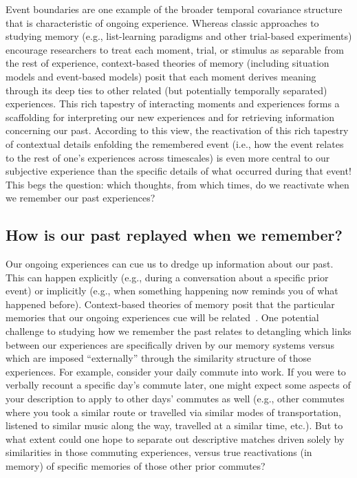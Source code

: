 \documentclass{article}
\begin{document}
Event boundaries are one example of the broader temporal covariance structure that is characteristic of ongoing experience.  Whereas classic approaches to studying memory (e.g., list-learning paradigms and other trial-based experiments) encourage researchers to treat each moment, trial, or stimulus as separable from the rest of experience, context-based theories of memory (including situation models and event-based models) posit that each moment derives meaning through its deep ties to other related (but potentially temporally separated) experiences.  This rich tapestry of interacting moments and experiences forms a scaffolding for interpreting our new experiences and for retrieving information concerning our past.  According to this view, the reactivation of this rich tapestry of contextual details enfolding the remembered event (i.e., how the event relates to the rest of one's experiences across timescales) is even more central to our subjective experience than the specific details of what occurred during that event!  This begs the question: which thoughts, from which times, do we reactivate when we remember our past experiences?

\subsection*{How is our past replayed when we remember?}
Our ongoing experiences can cue us to dredge up information about our past.  This can happen explicitly (e.g., during a conversation about a specific prior event) or implicitly (e.g., when something happening now reminds you of what happened before).  Context-based theories of memory posit that the particular memories that our ongoing experiences cue will be related~\citep[contextually, semantically, functionally, etc.; e.g., ][]{PolyEtal09}.  One potential challenge to studying how we remember the past relates to detangling which links between our experiences are specifically driven by our memory systems versus which are imposed ``externally'' through the similarity structure of those experiences.  For example, consider your daily commute into work.  If you were to verbally recount a specific day's commute later, one might expect some aspects of your description to apply to other days' commutes as well (e.g., other commutes where you took a similar route or travelled via similar modes of transportation, listened to similar music along the way, travelled at a similar time, etc.).  But to what extent could one hope to separate out descriptive matches driven solely by similarities in those commuting experiences, versus true reactivations (in memory) of specific memories of those other prior commutes?
\end{document}

